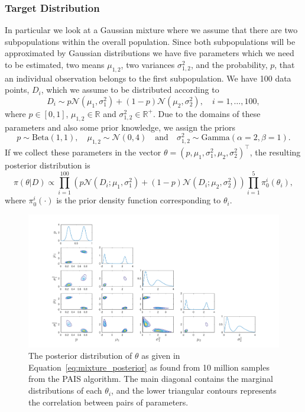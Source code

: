 \documentclass[final]{siamltex}
\begin{document}
\subsubsection{Target Distribution}\label{sec:mixture_target}

In particular we look at a Gaussian mixture where we assume that there are two subpopulations within the overall population. Since both subpopulations will be approximated by Gaussian distributions we have five parameters which we need to be estimated, two means $\mu_{1,2}$, two variances $\sigma^2_{1,2}$, and the probability, $p$, that an individual observation belongs to the first subpopulation. We have 100 data points, $D_i$, which we assume to be distributed according to
\[
	D_i \sim p\mathcal{N}(\mu_1, \sigma^2_1) + (1-p)\mathcal{N}(\mu_2, \sigma^2_2), \quad i = 1,\dots,100,
\]
where $p \in [0, 1]$, $\mu_{1,2} \in \mathbb{R}$ and $\sigma^2_{1,2} \in \mathbb{R}^+$. Due to the domains of these parameters and also some prior knowledge, we assign the priors
\[
	p \sim \text{Beta}(1,1), \quad \mu_{1,2} \sim \mathcal{N}(0, 4) \quad \text{and} \quad \sigma^2_{1,2} \sim \text{Gamma}(\alpha=2, \beta=1).
\]
If we collect these parameters in the vector $\theta = (p, \mu_1, \sigma^2_1, \mu_2, \sigma^2_2)^\top$, the resulting posterior distribution is
\begin{equation}\label{eq:mixture_posterior}
	\pi(\theta|D) \propto \prod\limits_{i=1}^{100} (p\mathcal{N}(D_i;\mu_1, \sigma^2_1) + (1-p)\mathcal{N}(D_i;\mu_2, \sigma^2_2))\prod\limits_{i=1}^5 \pi_0^i(\theta_i),
\end{equation}
where $\pi_0^i(\cdot)$ is the prior density function corresponding to $\theta_i$.

\begin{figure}[htb]
\centering
\includegraphics[width=\textwidth]{"figures/PAIS_best_posterior"}
\caption{The posterior distribution of $\theta$ as given in Equation~\eqref{eq:mixture_posterior} as found from 10 million samples from the PAIS algorithm. The main diagonal contains the marginal distributions of each $\theta_i$, and the lower triangular contours represents the correlation between pairs of parameters.}
\label{fig:mixture_posterior}
\end{figure}
\end{document}
